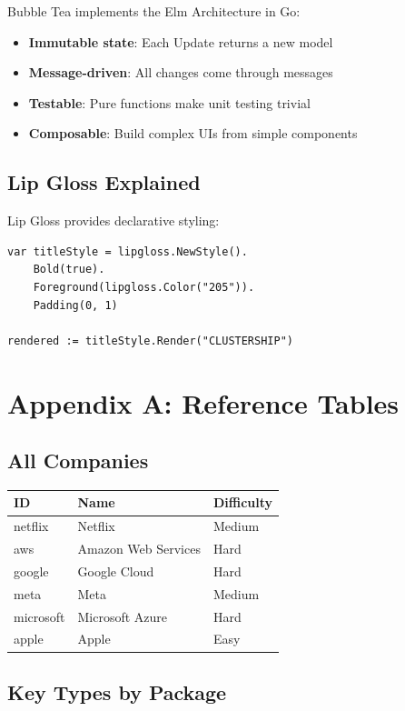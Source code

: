 \documentclass[11pt]{article}
\begin{document}
Bubble Tea implements the Elm Architecture in Go:
\begin{itemize}
    \item \textbf{Immutable state}: Each Update returns a new model
    \item \textbf{Message-driven}: All changes come through messages
    \item \textbf{Testable}: Pure functions make unit testing trivial
    \item \textbf{Composable}: Build complex UIs from simple components
\end{itemize}

\subsection{Lip Gloss Explained}

Lip Gloss provides declarative styling:
\begin{lstlisting}
var titleStyle = lipgloss.NewStyle().
    Bold(true).
    Foreground(lipgloss.Color("205")).
    Padding(0, 1)

rendered := titleStyle.Render("CLUSTERSHIP")
\end{lstlisting}


\section*{Appendix A: Reference Tables}


\subsection*{All Companies}

\begin{longtable}{@{}lll@{}}
\toprule
\textbf{ID} & \textbf{Name} & \textbf{Difficulty} \\
\midrule
\endhead
netflix & Netflix & Medium \\
aws & Amazon Web Services & Hard \\
google & Google Cloud & Hard \\
meta & Meta & Medium \\
microsoft & Microsoft Azure & Hard \\
apple & Apple & Easy \\
\bottomrule
\end{longtable}

\subsection*{Key Types by Package}
\end{document}
